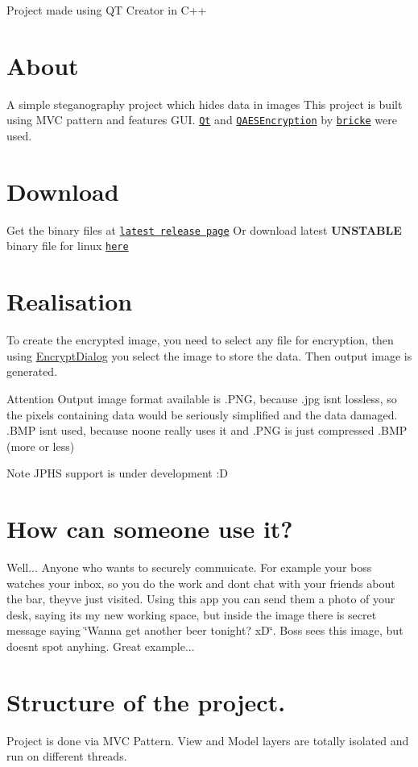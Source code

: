 Project made using QT Creator in C++\hypertarget{index_about}{}\section{About}\label{index_about}
A simple steganography project which hides data in images This project is built using M\+VC pattern and features G\+UI. \href{https://qt.io}{\tt Qt} and \href{https://github.com/bricke/Qt-AES}{\tt Q\+A\+E\+S\+Encryption} by \href{https://github.com/bricke}{\tt bricke} were used. \hypertarget{index_download}{}\section{Download}\label{index_download}
Get the binary files at \href{https://github.com/waleko/PictureCrypt/releases/latest}{\tt latest release page} Or download latest {\bfseries U\+N\+S\+T\+A\+B\+LE} binary file for linux \href{https://github.com/waleko/PictureCrypt/raw/gh-pages/src/build/Release/PictureCrypt}{\tt here} \hypertarget{index_real}{}\section{Realisation}\label{index_real}
To create the encrypted image, you need to select any file for encryption, then using \hyperlink{class_encrypt_dialog}{Encrypt\+Dialog} you select the image to store the data. Then output image is generated. \begin{DoxyAttention}{Attention}
Output image format available is .P\+NG, because .jpg isn\textquotesingle{}t lossless, so the pixels containing data would be seriously simplified and the data damaged. .B\+MP isn\textquotesingle{}t used, because noone really uses it and .P\+NG is just compressed .B\+MP (more or less) 
\end{DoxyAttention}
\begin{DoxyNote}{Note}
J\+P\+HS support is under development \+:D
\end{DoxyNote}
\hypertarget{index_use}{}\section{How can someone use it?}\label{index_use}
Well... Anyone who wants to securely commuicate. For example your boss watches your inbox, so you do the work and don\textquotesingle{}t chat with your friends about the bar, they\textquotesingle{}ve just visited. Using this app you can send them a photo of your desk, saying it\textquotesingle{}s my new working space, but inside the image there is secret message saying \char`\"{}\+Wanna get another beer tonight? x\+D\char`\"{}. Boss sees this image, but doesn\textquotesingle{}t spot anyhing. Great example... \hypertarget{index_structure}{}\section{Structure of the project.}\label{index_structure}
Project is done via M\+VC Pattern. View and Model layers are totally isolated and run on different threads.

